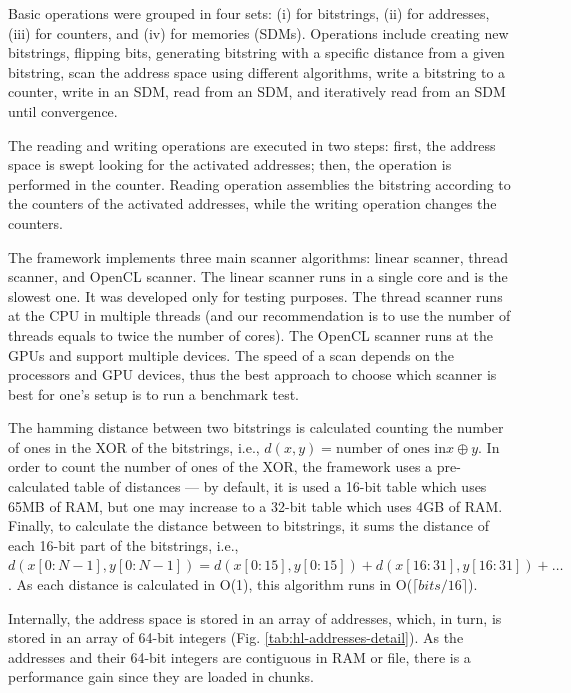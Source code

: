 Basic operations were grouped in four sets: (i) for bitstrings, (ii) for addresses, (iii) for counters, and (iv) for memories (SDMs). Operations include creating new bitstrings, flipping bits, generating bitstring with a specific distance from a given bitstring, scan the address space using different algorithms, write a bitstring to a counter, write in an SDM, read from an SDM, and iteratively read from an SDM until convergence.

The reading and writing operations are executed in two steps: first, the address space is swept looking for the activated addresses; then, the operation is performed in the counter. Reading operation assemblies the bitstring according to the counters of the activated addresses, while the writing operation changes the counters.

The framework implements three main scanner algorithms: linear scanner, thread scanner, and OpenCL scanner. The linear scanner runs in a single core and is the slowest one. It was developed only for testing purposes. The thread scanner runs at the CPU in multiple threads (and our recommendation is to use the number of threads equals to twice the number of cores). The OpenCL scanner runs at the GPUs and support multiple devices. The speed of a scan depends on the processors and GPU devices, thus the best approach to choose which scanner is best for one's setup is to run a benchmark test. 

The hamming distance between two bitstrings is calculated counting the number of ones in the XOR of the bitstrings, i.e., $d(x, y) = \text{number of ones in} x \oplus y$. In order to count the number of ones of the XOR, the framework uses a pre-calculated table of distances --- by default, it is used a 16-bit table which uses 65MB of RAM, but one may increase to a 32-bit table which uses 4GB of RAM. Finally, to calculate the distance between to bitstrings, it sums the distance of each 16-bit part of the bitstrings, i.e., $d(x[0:N-1], y[0:N-1]) = d(x[0:15], y[0:15]) + d(x[16:31], y[16:31]) + \dots$. As each distance is calculated in O(1), this algorithm runs in O($\lceil bits/16 \rceil$).

Internally, the address space is stored in an array of addresses, which, in turn, is stored in an array of 64-bit integers (Fig. \ref{tab:hl-addresses-detail}). As the addresses and their 64-bit integers are contiguous in RAM or file, there is a performance gain since they are loaded in chunks.


